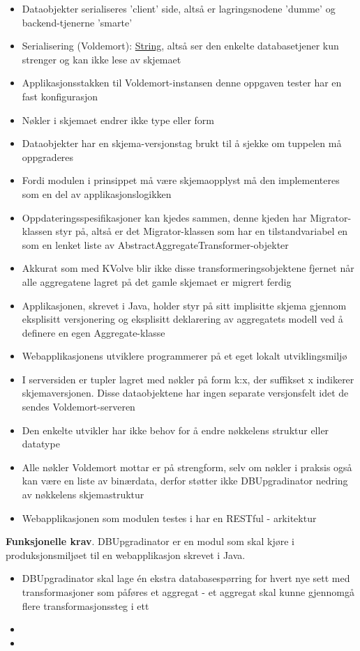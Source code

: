 \begin{itemize}
  \item Dataobjekter serialiseres 'client' side, altså er lagringsnodene 'dumme' og backend-tjenerne 'smarte'
  \item Serialisering (Voldemort): \underline{String}, altså ser den enkelte databasetjener kun strenger og kan ikke lese av skjemaet
  \item Applikasjonsstakken til Voldemort-instansen denne oppgaven tester har en fast konfigurasjon
  \item Nøkler i skjemaet endrer ikke type eller form
  \item Dataobjekter har en skjema-versjonstag brukt til å sjekke om tuppelen må oppgraderes
  \item Fordi modulen i prinsippet må være skjemaopplyst må den implementeres som en del av applikasjonslogikken
  \item Oppdateringsspesifikasjoner kan kjedes sammen, denne kjeden har Migrator-klassen styr på, altså er det Migrator-klassen som har en tilstandvariabel en som en lenket liste av AbstractAggregateTransformer-objekter
  \item Akkurat som med KVolve blir ikke disse transformeringsobjektene fjernet når alle aggregatene lagret på det gamle skjemaet er migrert ferdig
  \item Applikasjonen, skrevet i Java, holder styr på sitt implisitte skjema gjennom eksplisitt versjonering og eksplisitt deklarering av aggregatets modell ved å definere en egen Aggregate-klasse
  \item Webapplikasjonens utviklere programmerer på et eget lokalt utviklingsmiljø
  \item I serversiden er tupler lagret med nøkler på form k:x, der suffikset x indikerer skjemaversjonen. Disse dataobjektene har ingen separate versjonsfelt idet de sendes Voldemort-serveren
  \item Den enkelte utvikler har ikke behov for å endre nøkkelens struktur eller datatype
  \item Alle nøkler Voldemort mottar er på strengform, selv om nøkler i praksis også kan være en liste av binærdata, derfor støtter ikke DBUpgradinator nedring av nøkkelens skjemastruktur
  \item Webapplikasjonen som modulen testes i har en RESTful - arkitektur
\end{itemize}

\textbf{Funksjonelle krav}. DBUpgradinator er en modul som skal kjøre i produksjonsmiljøet til en webapplikasjon skrevet i Java.

\begin{itemize}
  \item DBUpgradinator skal lage én ekstra databasespørring for hvert nye sett med transformasjoner som påføres et aggregat - et aggregat skal kunne gjennomgå flere transformasjonssteg i ett
  \item 
  \item 
\end{itemize}
